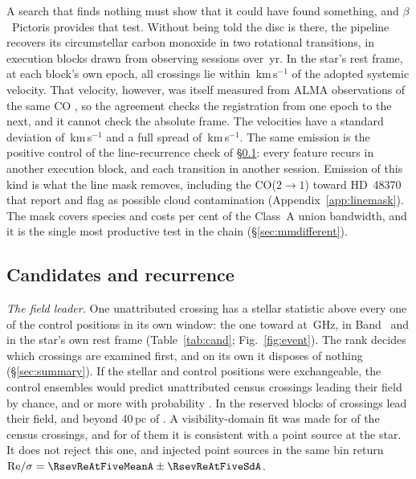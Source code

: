 A search that finds nothing must show that it could have found something,
and $\beta$~Pictoris provides that test. Without being told the disc is
there, the pipeline recovers its circumstellar carbon monoxide
\citep{Dent2014,Matra2017} in two rotational transitions, in
\CsBpCoBlocks{} execution blocks drawn from \CsBpCoSess{} observing sessions
over \BpBaselineYr\,yr. In the star's rest frame, at each block's own epoch,
all \BpicPanelNCo{} crossings lie within \BpicDvCoHi\,km\,s$^{-1}$ of the
adopted systemic velocity. That velocity, however, was itself measured from
ALMA observations of the same CO \citep{Matra2017}, so the agreement checks
the registration from one epoch to the next, and it cannot check the
absolute frame.
The \LrBpNVel{} velocities have a standard deviation of
\LrBpDvSd\,km\,s$^{-1}$ and a full spread of \LrBpDvRange\,km\,s$^{-1}$. The same emission is the positive control of the
line-recurrence check of \S\ref{sec:etacrv}: every feature recurs in another
execution block, and each transition in another session. Emission of this
kind is what the line mask removes, including the CO($2{\to}1$) toward
HD~48370 that \citet{Cataldi2023} report and flag as possible cloud
contamination (Appendix~\ref{app:linemask}). The mask covers \FrNSpec{}
species and costs \MkMaskAPct{} per cent of the Class~A union bandwidth, and
it is the single most productive test in the chain
(\S\ref{sec:mmdifferent}).

\subsection{Candidates and recurrence}
\label{sec:etacrv}

\label{sec:vistest}%
\emph{The field leader.} One unattributed crossing has a stellar statistic
above every one of the \NCtrl{} control positions in its own window: the one toward
\EvAStar{} at \RqFreqSx\,GHz, in Band~\EvABand{} and in the star's own rest
frame (Table~\ref{tab:cand}; Fig.~\ref{fig:event}). The rank decides which
crossings are examined first, and on its own it disposes of nothing
(\S\ref{sec:summary}). If the stellar and control positions were
exchangeable, the control ensembles would predict \RkCondExp{} unattributed
census crossings leading their field by chance, and \RkCondNObsWord{} or more
with probability \RkCondProb. In the reserved blocks \RkHoLead{} of \RkHoN{}
crossings lead their field, and beyond 40\,pc \RkOosLead{} of \RkOosN. A
visibility-domain fit was made for \CsNVisFit{} of the \CsNCross{} census
crossings, and for \CsNVisLocal{} of them it is consistent with a point source
at the star. It does not reject this one, and injected point sources in
the same bin return ${\rm Re}/\sigma=\RsevReAtFiveMeanA\pm\RsevReAtFiveSdA$.

